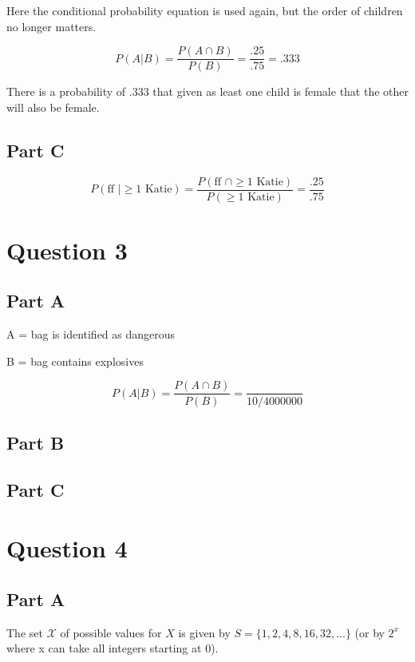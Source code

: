 \documentclass[letterpaper]{article}
\begin{document}
Here the conditional probability equation is used again, but the order of  children no longer matters.

$$P(A|B) = \frac{P(A \cap B)}{P(B)} = \frac{.25}{.75} = .333$$

\noindent There is a probability of .333 that given as least one child is female that the other will also be female.

\subsection*{Part C}

$$P(\text{ff } | \geq \text{1 Katie}) = \frac{P(\text{ff } \cap \geq \text{1 Katie})}{P(\geq  \text{1 Katie})} = \frac{.25}{.75}$$

\newpage

\section*{Question 3}

\subsection*{Part A}

A = {bag is identified as dangerous}

\noindent B = {bag contains explosives}

$$P(A|B) = \frac{P(A \cap B)}{P(B)} = \frac{}{10/4000000}$$

\subsection*{Part B}

\subsection*{Part C}

\newpage

\section*{Question 4}

\subsection*{Part A}

The set $\mathcal{X}$ of possible values for $X$ is given by $S = \{ 1, 2, 4, 8, 16, 32, ...\}$ (or by $2^x$ where x can take all integers starting at 0).
\end{document}
